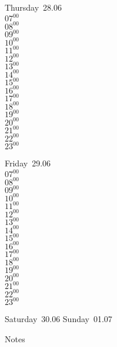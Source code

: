 \documentclass[11pt, a4paper]{book}\usepackage[]{graphicx}\usepackage[]{color}
\begin{document}
\begin{weekdaybox}
  Thursday~28.06\\
  { 
  \vfill
  $07^{00}$\\
$08^{00}$\\
$09^{00}$\\
$10^{00}$\\
$11^{00}$\\
$12^{00}$\\
$13^{00}$\\
$14^{00}$\\
$15^{00}$\\
$16^{00}$\\
$17^{00}$\\
$18^{00}$\\
$19^{00}$\\
$20^{00}$\\
$21^{00}$\\
$22^{00}$\\
$23^{00}$\\
  }
\end{weekdaybox} 
\begin{weekdaybox}
  Friday~29.06\\
  { 
  \vfill
  $07^{00}$\\
$08^{00}$\\
$09^{00}$\\
$10^{00}$\\
$11^{00}$\\
$12^{00}$\\
$13^{00}$\\
$14^{00}$\\
$15^{00}$\\
$16^{00}$\\
$17^{00}$\\
$18^{00}$\\
$19^{00}$\\
$20^{00}$\\
$21^{00}$\\
$22^{00}$\\
$23^{00}$\\
  }
\end{weekdaybox}
\begin{weekendbox}
  Saturday~30.06
  \tcblower
  Sunday~01.07
\end{weekendbox} %
\begin{notebox}
  Notes
\end{notebox}
\clearpage
\end{document}
